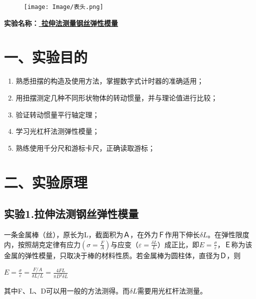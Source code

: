 \documentclass[11pt,a4paper,oneside]{article}
\begin{document}
\begin{figure}[H]
 \centering
  \texttt{[image: Image/表头.png]}
\end{figure}
\begin{center}
\textbf{{\large 实验名称：\uline{          拉伸法测量钢丝弹性模量       }}}
\end{center}


\section*{一、实验目的}
\begin{enumerate}
\item 熟悉扭摆的构造及使用方法，掌握数字式计时器的准确适用；
\item 用扭摆测定几种不同形状物体的转动惯量，并与理论值进行比较；
\item 验证转动惯量平行轴定理；
\item 学习光杠杆法测弹性模量；
\item 熟练使用千分尺和游标卡尺，正确读取游标；
\end{enumerate}

\section*{二、实验原理}
\subsection*{实验1.拉伸法测钢丝弹性模量}
一条金属棒（丝），原长为L，截面积为Ａ，在外力Ｆ作用下伸长$\delta L$。在弹性限度内，按照胡克定律有应力$(\sigma =\displaystyle\frac{F}{A})$与应变$（\varepsilon =\displaystyle\frac{\delta L}{L}）$成正比，即$E=\displaystyle\frac{\sigma }{\varepsilon }$，Ｅ称为该金属的弹性模量，只取决于棒的材料性质。若金属棒为圆柱体，直径为Ｄ，则
\begin{center}
$　E=\displaystyle\frac{\sigma }{\varepsilon }=\displaystyle\frac{F/A}{\delta L/L}=\displaystyle\frac{4FL}{\pi D^{2}\delta L}$
\end{center}
其中F、L、D可以用一般的方法测得。而$\delta L$需要用光杠杆法测量。
\end{document}
